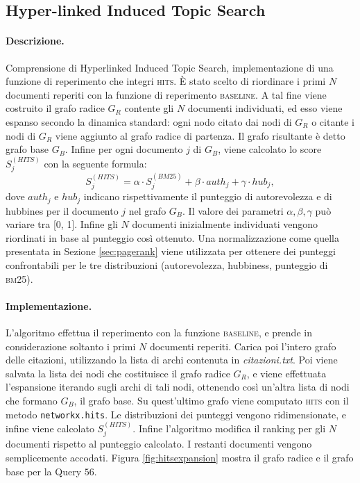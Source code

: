 \subsection{Hyper-linked Induced Topic Search}
\label{sec:hits}

\paragraph{\textbf{Descrizione.}}
Comprensione di Hyperlinked Induced Topic Search, implementazione di una funzione di reperimento che integri \textsc{hits}. \`E stato scelto di riordinare i primi $N$ documenti reperiti con la funzione di reperimento \textsc{baseline}. A tal fine viene costruito il grafo radice $G_R$ contente gli $N$ documenti individuati, ed esso viene espanso secondo la dinamica standard: ogni nodo citato dai nodi di $G_R$ o citante i nodi di $G_R$ viene aggiunto al grafo radice di partenza. Il grafo risultante \`e detto grafo base $G_B$. Infine per ogni documento $j$ di $G_B$, viene calcolato lo score $S^{(HITS)}_{j}$ con la seguente formula:
\[ S^{(HITS)}_j =  \alpha \cdot S^{(BM25)}_j + \beta \cdot auth_j + \gamma \cdot hub_j,\]
dove $auth_j$ e $hub_j$ indicano rispettivamente il punteggio di autorevolezza e di hubbines per il documento $j$ nel grafo $G_B$. Il valore dei parametri $\alpha, \beta, \gamma$ pu\`o variare tra [0, 1]. Infine gli $N$ documenti inizialmente individuati vengono riordinati in base al punteggio cos\`i ottenuto. Una normalizzazione come quella presentata in Sezione \ref{sec:pagerank} viene utilizzata per ottenere dei punteggi confrontabili per le tre distribuzioni (autorevolezza, hubbiness, punteggio di \textsc{bm25}).
\paragraph{\textbf{Implementazione.}}
L'algoritmo effettua il reperimento con la funzione \textsc{baseline}, e prende in considerazione soltanto i primi $N$ documenti reperiti. Carica poi l'intero grafo delle citazioni, utilizzando la lista di archi contenuta in \textit{citazioni.txt}. Poi viene salvata la lista dei nodi che costituisce il grafo radice $G_R$, e viene effettuata l'espansione iterando sugli archi di tali nodi, ottenendo cos\`i un'altra lista di nodi che formano $G_B$, il grafo base. Su quest'ultimo grafo viene computato \textsc{hits} con il metodo \texttt{networkx.hits}. Le distribuzioni dei punteggi vengono ridimensionate, e infine viene calcolato $S^{(HITS)}_j$. Infine l'algoritmo modifica il ranking per gli $N$ documenti rispetto al punteggio calcolato. I restanti documenti vengono semplicemente accodati. Figura \ref{fig:hitsexpansion} mostra il grafo radice e il grafo base per la Query $56$.

